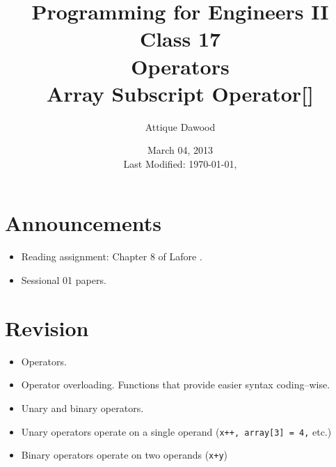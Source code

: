 \documentclass[12pt,a4paper]{article}
\date{March 04, 2013\\[0.2cm] Last Modified: \today, \currenttime}
\title{\vspace{-2cm}Programming for Engineers II\\Class 17\\Operators\\Array Subscript Operator[]}
\author{Attique Dawood}
\begin{document}
\maketitle
\section{Announcements}
\begin{itemize}
\item Reading assignment: Chapter 8 of Lafore \cite{Lafore}.
\item Sessional 01 papers.
\end{itemize}
\section{Revision}
\begin{itemize}
\item Operators.
\item Operator overloading. Functions that provide easier syntax coding--wise.
\item Unary and binary operators.
\item Unary operators operate on a single operand (\verb|x++, array[3] = 4,| etc.)
\item Binary operators operate on two operands (\verb|x+y|)
\end{itemize}
\end{document}
